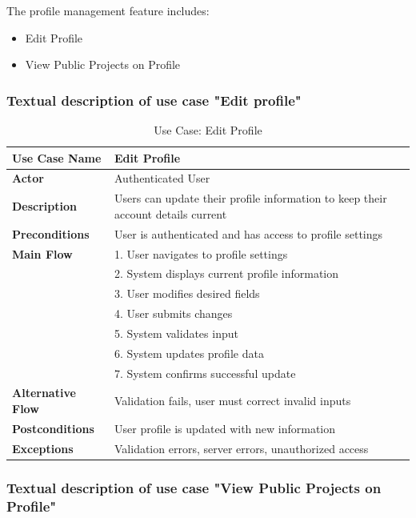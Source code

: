 The profile management feature includes:

\begin{itemize}
\item Edit Profile
\item View Public Projects on Profile
\end{itemize}

\subsubsection{Textual description of use case "Edit profile"}

\begin{table}[H]
\centering
\caption{Use Case: Edit Profile}
\begin{tabular}{|p{3cm}|p{10cm}|}
\hline
\textbf{Use Case Name} & Edit Profile \\
\hline
\textbf{Actor} & Authenticated User \\
\hline
\textbf{Description} & Users can update their profile information to keep their account details current \\
\hline
\textbf{Preconditions} & User is authenticated and has access to profile settings \\
\hline
\textbf{Main Flow} & 
1. User navigates to profile settings \\
& 2. System displays current profile information \\
& 3. User modifies desired fields \\
& 4. User submits changes \\
& 5. System validates input \\
& 6. System updates profile data \\
& 7. System confirms successful update \\
\hline
\textbf{Alternative Flow} & Validation fails, user must correct invalid inputs \\
\hline
\textbf{Postconditions} & User profile is updated with new information \\
\hline
\textbf{Exceptions} & Validation errors, server errors, unauthorized access \\
\hline
\end{tabular}
\end{table}

\subsubsection{Textual description of use case "View Public Projects on Profile"}

